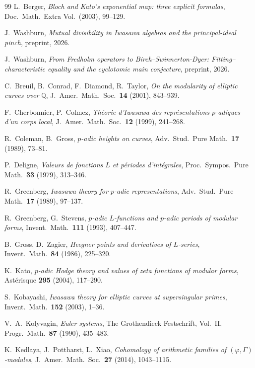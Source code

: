 \documentclass[12pt,reqno]{amsart}
\theoremstyle{definition}
\theoremstyle{remark}
\newcommand{\Q}{\mathbb{Q}}
\begin{document}
\begin{thebibliography}{99}
L.~Berger, \emph{Bloch and Kato's exponential map: three explicit formulas}, Doc.\ Math.\ Extra Vol.\ (2003), 99--129.

J.~Washburn, \emph{Mutual divisibility in Iwasawa algebras and the principal-ideal pinch}, preprint, 2026.

J.~Washburn, \emph{From Fredholm operators to Birch--Swinnerton-Dyer: Fitting--characteristic equality and the cyclotomic main conjecture}, preprint, 2026.

C.~Breuil, B.~Conrad, F.~Diamond, R.~Taylor, \emph{On the modularity of elliptic curves over $\Q$}, J.\ Amer.\ Math.\ Soc.\ \textbf{14} (2001), 843--939.

F.~Cherbonnier, P.~Colmez, \emph{Th\'eorie d'Iwasawa des repr\'esentations $p$-adiques d'un corps local}, J.\ Amer.\ Math.\ Soc.\ \textbf{12} (1999), 241--268.

R.~Coleman, B.~Gross, \emph{$p$-adic heights on curves}, Adv.\ Stud.\ Pure Math.\ \textbf{17} (1989), 73--81.

P.~Deligne, \emph{Valeurs de fonctions $L$ et p\'eriodes d'int\'egrales}, Proc.\ Sympos.\ Pure Math.\ \textbf{33} (1979), 313--346.

R.~Greenberg, \emph{Iwasawa theory for $p$-adic representations}, Adv.\ Stud.\ Pure Math.\ \textbf{17} (1989), 97--137.

R.~Greenberg, G.~Stevens, \emph{$p$-adic $L$-functions and $p$-adic periods of modular forms}, Invent.\ Math.\ \textbf{111} (1993), 407--447.

B.~Gross, D.~Zagier, \emph{Heegner points and derivatives of $L$-series}, Invent.\ Math.\ \textbf{84} (1986), 225--320.

K.~Kato, \emph{$p$-adic Hodge theory and values of zeta functions of modular forms}, Ast\'erisque \textbf{295} (2004), 117--290.

S.~Kobayashi, \emph{Iwasawa theory for elliptic curves at supersingular primes}, Invent.\ Math.\ \textbf{152} (2003), 1--36.

V.~A.~Kolyvagin, \emph{Euler systems}, The Grothendieck Festschrift, Vol.~II, Progr.\ Math.\ \textbf{87} (1990), 435--483.

K.~Kedlaya, J.~Pottharst, L.~Xiao, \emph{Cohomology of arithmetic families of $(\varphi,\Gamma)$-modules}, J.\ Amer.\ Math.\ Soc.\ \textbf{27} (2014), 1043--1115.


\end{thebibliography}
\end{document}
